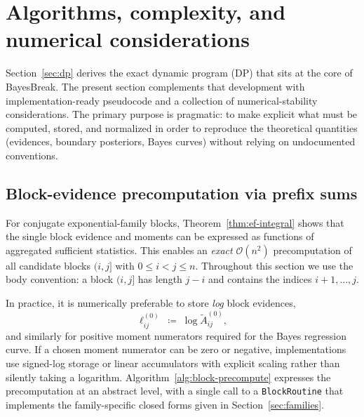 \section{Algorithms, complexity, and numerical considerations}
\label{sec:algorithms}

Section~\ref{sec:dp} derives the exact dynamic program (DP) that sits at the core of BayesBreak.
The present section complements that development with implementation-ready pseudocode and a
collection of numerical-stability considerations.
The primary purpose is pragmatic: to make explicit what must be computed, stored, and
normalized in order to reproduce the theoretical quantities (evidences, boundary posteriors,
Bayes curves) without relying on undocumented conventions.

\subsection{Block-evidence precomputation via prefix sums}
\label{sec:alg-blocks}

For conjugate exponential-family blocks, Theorem~\ref{thm:ef-integral} shows that the single
block evidence and moments can be expressed as functions of aggregated sufficient statistics.
This enables an \emph{exact} $\mathcal{O}(n^2)$ precomputation of all candidate blocks $(i,j]$
with $0\le i<j\le n$. Throughout this section we use the body convention: a block $(i,j]$ has
length $j-i$ and contains the indices $i+1,\dots,j$.

In practice, it is numerically preferable to store \emph{log} block evidences,
\begin{equation}
    \ell_{i j}^{(0)} \;\coloneqq\; \log \widetilde{A}^{(0)}_{i j},
\end{equation}
and similarly for positive moment numerators required for the Bayes regression curve. If a chosen
moment numerator can be zero or negative, implementations use signed-log storage or linear
accumulators with explicit scaling rather than silently taking a logarithm.
Algorithm~\ref{alg:block-precompute} expresses the precomputation at an abstract level, with a
single call to a \texttt{BlockRoutine} that implements the family-specific closed forms given in
Section~\ref{sec:families}.

